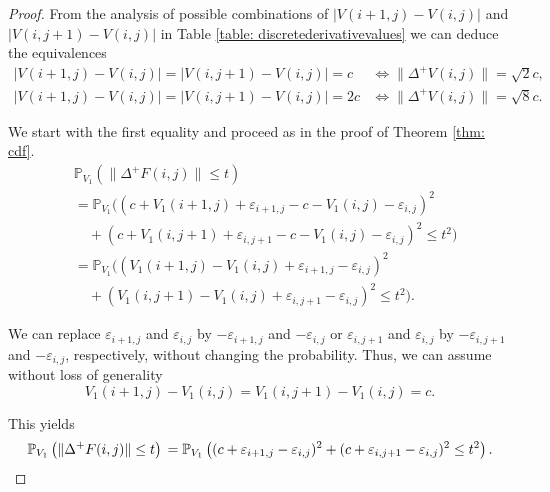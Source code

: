 \documentclass[a4paper,12pt]{article}
\newcommand{\abs}[1]{\lvert#1\rvert}
\newcommand{\norm}[1]{\lVert#1\rVert}
\theoremstyle{plain}
\theoremstyle{definition}
\begin{document}
\begin{proof}
	From the analysis of possible combinations of $\abs{V(i + 1, j) - V(i, j)}$ and $\abs{V(i, j + 1) - V(i, j)}$ in Table \ref{table: discretederivativevalues} we can deduce the equivalences
	\begin{align*}
		\abs{V(i + 1, j) - V(i, j)} = \abs{V(i, j + 1) - V(i, j)} = c &\Leftrightarrow \norm{\Delta^+ V(i, j)} = \sqrt{2} c, \\
		\abs{V(i + 1, j) - V(i, j)} = \abs{V(i, j + 1) - V(i, j)} = 2 c &\Leftrightarrow \norm{\Delta^+ V(i, j)} = \sqrt{8} c.
	\end{align*}
	
	We start with the first equality and proceed as in the proof of Theorem \ref{thm: cdf}.
	\begin{align*}
		&\mathbb{P}_{V_1}\left( \norm{\Delta^+ F(i, j)} \leq t \right) \\
		&= \mathbb{P}_{V_1}\big( (c + V_1(i + 1, j) + \varepsilon_{i + 1, j} - c - V_1(i, j) - \varepsilon_{i, j})^2 \\
		&\quad + (c + V_1(i, j + 1) + \varepsilon_{i, j + 1} - c - V_1(i, j) - \varepsilon_{i, j})^2 \leq t^2 \big) \\
		&= \mathbb{P}_{V_1}\big( (V_1(i + 1, j) - V_1(i, j) + \varepsilon_{i + 1, j} - \varepsilon_{i, j})^2 \\
		&\quad + (V_1(i, j + 1) - V_1(i, j) + \varepsilon_{i, j + 1} - \varepsilon_{i, j})^2 \leq t^2 \big).
	\end{align*}
	
	We can replace $\varepsilon_{i + 1, j}$ and $\varepsilon_{i, j}$ by $- \varepsilon_{i + 1, j}$ and $- \varepsilon_{i, j}$ or $\varepsilon_{i, j + 1}$ and $\varepsilon_{i, j}$ by $- \varepsilon_{i, j + 1}$ and $- \varepsilon_{i, j}$, respectively, without changing the probability. Thus, we can assume without loss of generality
	\begin{equation*}
		V_1(i + 1, j) - V_1(i, j) = V_1(i, j + 1) - V_1(i, j) = c.
	\end{equation*}
	
	This yields
	\begin{equation*}
		\mathbb{P}_{V_1}\left( \norm{\Delta^+ F(i, j)} \leq t \right) \\
		= \mathbb{P}_{V_1}\left( (c + \varepsilon_{i + 1, j} - \varepsilon_{i, j})^2 + (c + \varepsilon_{i, j + 1} - \varepsilon_{i, j})^2 \leq t^2 \right).
	\end{equation*}
	

\end{proof}
\end{document}
